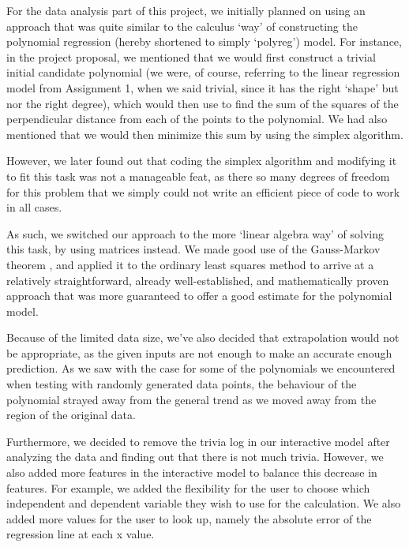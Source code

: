 \documentclass[12pt]{article}
\begin{document}
\begin{enumerate}
\begin{text}
For the data analysis part of this project, we initially planned on using an approach that was quite similar to the calculus `way' of constructing the polynomial regression (hereby shortened to simply `polyreg') model. For instance, in the project proposal, we mentioned that we would first construct a trivial initial candidate polynomial (we were, of course, referring to the linear regression model from Assignment 1, when we said trivial, since it has the right `shape' but nor the right degree), which would then use to find the sum of the squares of the perpendicular distance from each of the points to the polynomial. We had also mentioned that we would then minimize this sum by using the simplex algorithm.

However, we later found out that coding the simplex algorithm and modifying it to fit this task was not a manageable feat, as there so many degrees of freedom for this problem that we simply could not write an efficient piece of code to work in all cases.

As such, we switched our approach to the more `linear algebra way' of solving this task, by using matrices instead. We made good use of the Gauss-Markov theorem \citep{Gmthrm11}, and applied it to the ordinary least squares method \citep{Ols} to arrive at a relatively straightforward, already well-established, and mathematically proven approach that was more guaranteed to offer a good estimate for the polynomial model.

Because of the limited data size, we've also decided that extrapolation would not be appropriate, as the given inputs are not enough to make an accurate enough prediction. As we saw with the case for some of the polynomials we encountered when testing with randomly generated data points, the behaviour of the polynomial strayed away from the general trend as we moved away from the region of the original data.

Furthermore, we decided to remove the trivia log in our interactive model after analyzing the data and finding out that there is not much trivia. However, we also added more features in the interactive model to balance this decrease in features. For example, we added the flexibility for the user to choose which independent and dependent variable they wish to use for the calculation. We also added more values for the user to look up, namely the absolute error of the regression line at each x value.

\end{text}


\end{enumerate}
\end{document}
